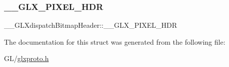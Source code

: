 \subsubsection{\texorpdfstring{\+\_\+\+\_\+\+G\+L\+X\+\_\+\+P\+I\+X\+E\+L\+\_\+\+H\+DR}{\_\_GLX\_PIXEL\_HDR}}
{\footnotesize\ttfamily \+\_\+\+\_\+\+G\+L\+Xdispatch\+Bitmap\+Header\+::\+\_\+\+\_\+\+G\+L\+X\+\_\+\+P\+I\+X\+E\+L\+\_\+\+H\+DR}



The documentation for this struct was generated from the following file\+:\begin{DoxyCompactItemize}
\item 
G\+L/\hyperlink{glxproto_8h}{glxproto.\+h}\end{DoxyCompactItemize}
